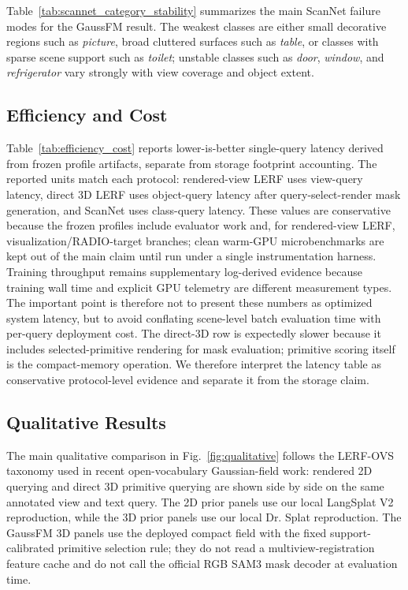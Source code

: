 \documentclass[journal,twoside]{IEEEtran}
\newcommand{\method}{GaussFM}
\begin{document}


Table~\ref{tab:scannet_category_stability} summarizes the main ScanNet failure
modes for the \method{} result. The weakest classes are either small decorative
regions such as \emph{picture}, broad cluttered surfaces such as \emph{table},
or classes with sparse scene support such as \emph{toilet}; unstable classes
such as \emph{door}, \emph{window}, and \emph{refrigerator} vary strongly with
view coverage and object extent.

\subsection{Efficiency and Cost}



Table~\ref{tab:efficiency_cost} reports lower-is-better single-query latency
derived from frozen profile artifacts, separate from storage footprint
accounting. The reported units match each protocol: rendered-view LERF uses
view-query latency, direct 3D LERF uses object-query latency after
query-select-render mask generation, and ScanNet uses class-query latency.
These values are conservative because the frozen profiles include evaluator
work and, for rendered-view LERF, visualization/RADIO-target branches; clean
warm-GPU microbenchmarks are kept out of the main claim until run under a
single instrumentation harness. Training throughput remains supplementary
log-derived evidence because training wall time and explicit GPU telemetry are
different measurement types.
The important point is therefore not to present these numbers as optimized
system latency, but to avoid conflating scene-level batch evaluation time with
per-query deployment cost. The direct-3D row is expectedly slower because it
includes selected-primitive rendering for mask evaluation; primitive scoring
itself is the compact-memory operation. We therefore interpret the latency table
as conservative protocol-level evidence and separate it from the storage claim.

\subsection{Qualitative Results}

The main qualitative comparison in Fig.~\ref{fig:qualitative} follows the
LERF-OVS taxonomy used in recent open-vocabulary Gaussian-field work: rendered
2D querying and direct 3D primitive querying are shown side by side on the same
annotated view and text query. The 2D prior panels use our local LangSplat
V2 reproduction, while the 3D prior panels use our local Dr. Splat reproduction.
The \method{} 3D panels use the deployed compact field with the fixed
support-calibrated primitive selection rule; they do not read a multiview-registration feature cache and do not call the
official RGB SAM3 mask decoder at evaluation time.
\end{document}
